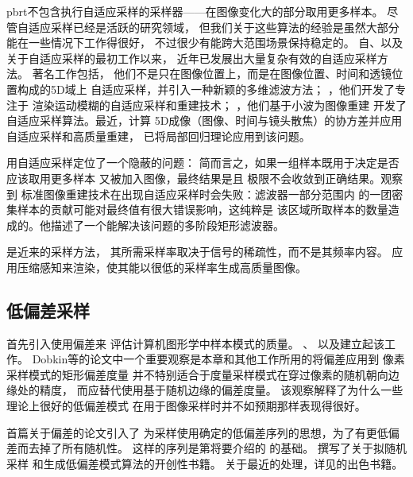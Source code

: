 pbrt不包含执行自适应采样的采样器——在图像变化大的部分取用更多样本。
尽管自适应采样已经是活跃的研究领域，
但我们关于这些算法的经验是虽然大部分能在一些情况下工作得很好，
不过很少有能跨大范围场景保持稳定的。
自\citet{10.1145/325334.325179}、\citet{10.1145/15922.15902}以及
\citet{PURGATHOFER1987157}关于自适应采样的最初工作以来，
近年已发展出大量复杂有效的自适应采样方法。
著名工作包括\citet{10.1145/1360612.1360632}，
他们不是只在图像位置上，而是在图像位置、时间和透镜位置构成的5D域上
自适应采样，并引入一种新颖的多维滤波方法；
\citet{10.1145/166117.166154}，他们开发了专注于
渲染运动模糊的自适应采样和重建技术；
\citet{10.1145/1618452.1618486}，他们基于小波为图像重建
开发了自适应采样算法。最近，\citet{10.1145/2487228.2487239}计算
5D成像（图像、时间与镜头散焦）的协方差并应用自适应采样和高质量重建，
\citet{10.1145/2641762}已将局部回归理论应用到该问题。

\citet{10.1145/122718.122735}用自适应采样定位了一个隐蔽的问题：
简而言之，如果一组样本既用于决定是否应该取用更多样本
又被加入图像，最终结果是且
极限不会收敛到正确结果。\citet{10.1145/37401.37410}观察到
标准图像重建技术在出现自适应采样时会失败：滤波器一部分范围内
的一团密集样本的贡献可能对最终值有很大错误影响，这纯粹是
该区域所取样本的数量造成的。他描述了一个能解决该问题的多阶段矩形滤波器。

是近来的采样方法，
其所需采样率取决于信号的稀疏性，而不是其频率内容。
\citet{5432169}应用压缩感知来渲染，使其能以很低的采样率生成高质量图像。

\subsection{低偏差采样}\label{sub:低偏差采样}
\citet{10.2312:egtp.19911013}首先引入使用偏差来
评估计算机图形学中样本模式的质量。
\citet{Mitchell92raytracing}、\citet{Dobkin1993:9}
以及\citet{10.1145/234535.234536}建立起该工作。
Dobkin等的论文中一个重要观察是本章和其他工作所用的将偏差应用到
像素采样模式的矩形偏差度量
并不特别适合于度量采样模式在穿过像素的随机朝向边缘处的精度，
而应替代使用基于随机边缘的偏差度量。
该观察解释了为什么一些理论上很好的低偏差模式
在用于图像采样时并不如预期那样表现得很好。

\citet{Mitchell92raytracing}首篇关于偏差的论文引入了
为采样使用确定的低偏差序列的思想，为了有更低偏差而去掉了所有随机性。
这样的序列是第将要介绍的
的基础。
\citet{10.1137/1.9781611970081}撰写了关于拟随机采样
和生成低偏差模式算法的开创性书籍。
关于最近的处理，详见\citet{dick_pillichshammer_2010}的出色书籍。

